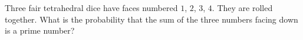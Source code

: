 Three fair tetrahedral dice have faces numbered $1$, $2$, $3$, $4$. They are rolled together. What is the probability that the sum of the three numbers facing down is a prime number?
